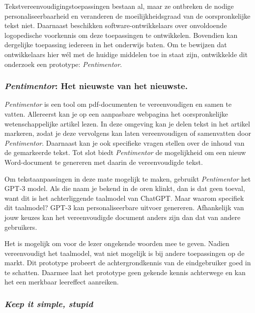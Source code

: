 \documentclass[a4paper,9pt,twoside]{report}
\begin{document}
\medspace

\noindent Tekstvereenvoudigingstoepassingen bestaan al, maar ze ontbreken de nodige personaliseerbaarheid en veranderen de moeilijkheidsgraad van de oorspronkelijke tekst niet. Daarnaast beschikken software-ontwikkelaars over onvoldoende logopedische voorkennis om deze toepassingen te ontwikkelen. Bovendien kan dergelijke toepassing iedereen in het onderwijs baten. Om te bewijzen dat ontwikkelaars hier wél met de huidige middelen toe in staat zijn, ontwikkelde dit onderzoek een prototype: \textit{Pentimentor}.

\subsubsection{\textit{Pentimentor}: Het nieuwste van het nieuwste.}

\textit{Pentimentor} is een tool om pdf-documenten te vereenvoudigen en samen te vatten. Allereerst kan je op een aanpasbare webpagina het oorspronkelijke wetenschappelijke artikel lezen. In deze omgeving kan je delen tekst in het artikel markeren, zodat je deze vervolgens kan laten vereenvoudigen of samenvatten door \textit{Pentimentor}. Daarnaast kan je ook specifieke vragen stellen over de inhoud van de gemarkeerde tekst. Tot slot biedt \textit{Pentimentor} de mogelijkheid om een nieuw Word-document te genereren met daarin de vereenvoudigde tekst.

\medspace

\noindent Om tekstaanpassingen in deze mate mogelijk te maken, gebruikt \textit{Pentimentor} het GPT-3 model. Als die naam je bekend in de oren klinkt, dan is dat geen toeval, want dit is het achterliggende taalmodel van ChatGPT. Maar waarom specifiek dit taalmodel? GPT-3 kan personaliseerbare uitvoer genereren. Afhankelijk van jouw keuzes kan het vereenvoudigde document anders zijn dan dat van andere gebruikers.

\medspace

\noindent Het is mogelijk om voor de lezer ongekende woorden mee te geven. Nadien vereenvoudigt het taalmodel, wat niet mogelijk is bij andere toepassingen op de markt. Dit prototype probeert de achtergrondkennis van de eindgebruiker goed in te schatten. Daarmee laat het prototype geen gekende kennis achterwege en kan het een merkbaar leereffect aanreiken.

\subsubsection{\textit{Keep it simple, stupid}}
\end{document}
